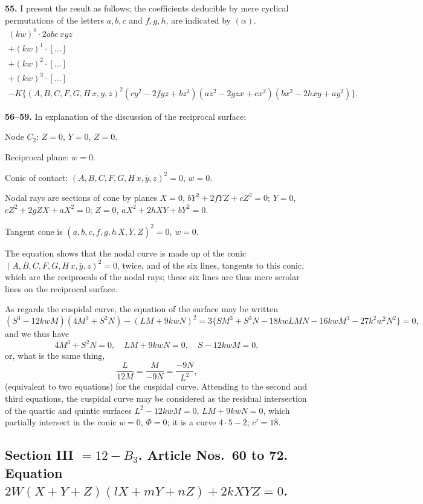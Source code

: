 \documentclass[11pt,a4paper]{article}
\theoremstyle{definition}
\begin{document}
\textbf{55.} I present the result as follows; the coefficients deducible by mere cyclical permutations of the letters $a, b, c$ and $f, g, h$, are indicated by $(\alpha)$.
\begin{multline*}
(kw)^0 \cdot 2abc\,xyz \\
+ (kw)^1 \cdot [\ldots] \\
+ (kw)^2 \cdot [\ldots] \\
+ (kw)^3 \cdot [\ldots] \\
- K\{(A, B, C, F, G, H \,\overline{\!\!x, y, z\!\!})^2(cy^2 - 2fyz + bz^2)(az^2 - 2gzx + cx^2)(bx^2 - 2hxy + ay^2)\}.
\end{multline*}

\textbf{56--59.} In explanation of the discussion of the reciprocal surface:

Node $C_2$: $Z = 0$, $Y = 0$, $Z = 0$.

Reciprocal plane: $w = 0$.

Conic of contact: $(A, B, C, F, G, H \,\overline{\!\!x, y, z\!\!})^2 = 0$, $w = 0$.

Nodal rays are sections of cone by planes $X = 0$, $bY^2 + 2fYZ + cZ^2 = 0$; $Y = 0$, $cZ^2 + 2gZX + aX^2 = 0$; $Z = 0$, $aX^2 + 2hXY + bY^2 = 0$.

Tangent cone is $(a, b, c, f, g, h \,\overline{\!\!X, Y, Z\!\!})^2 = 0$, $w = 0$.

The equation shows that the nodal curve is made up of the conic $(A, B, C, F, G, H \,\overline{\!\!x, y, z\!\!})^2 = 0$, twice, and of the six lines, tangents to this conic, which are the reciprocals of the nodal rays; these six lines are thus mere scrolar lines on the reciprocal surface.

As regards the cuspidal curve, the equation of the surface may be written
\[
(S^3 - 12kwM)(4M^3 + S^2N) - (LM + 9kwN)^2 = 3\{SM^3 + S^3N - 18kwLMN - 16kwM^3 - 27k^2w^2N^2\} = 0,
\]
and we thus have
\[
4M^3 + S^2N = 0, \quad LM + 9kwN = 0, \quad S - 12kwM = 0,
\]
or, what is the same thing,
\[
\frac{L}{12M} = \frac{M}{-9N} = \frac{-9N}{L^2},
\]
(equivalent to two equations) for the cuspidal curve. Attending to the second and third equations, the cuspidal curve may be considered as the residual intersection of the quartic and quintic surfaces $L^2 - 12kwM = 0$, $LM + 9kwN = 0$, which partially intersect in the conic $w = 0$, $\Phi = 0$; it is a curve $4 \cdot 5 - 2$; $c' = 18$.

\newpage
\setcounter{page}{391}

\subsection*{Section III $= 12 - B_3$. Article Nos.~60 to 72. Equation $2W(X + Y + Z)(lX + mY + nZ) + 2kXYZ = 0$.}
\end{document}
